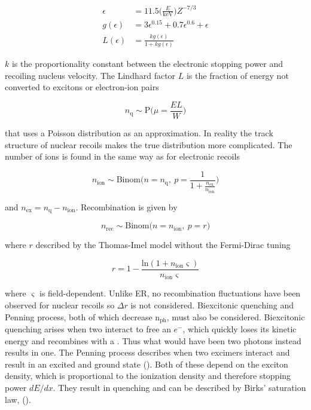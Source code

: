 \begin{subequations}
\begin{align}
\epsilon &= 11.5 \bigg( \frac{E}{\mathrm{keV}} \bigg) Z^{-7/3} \\
g( \epsilon ) &= 3 \epsilon ^{0.15} + 0.7 \epsilon ^{0.6} + \epsilon \\
L( \epsilon ) &= \frac{k g( \epsilon ) }{1 + k g( \epsilon )}
\end{align}
\label{eq:er_nr_calibrations_parameter_determ_nr_lindhard}
\end{subequations}

$k$ is the proportionality constant between the electronic stopping power and recoiling nucleus velocity.  The Lindhard factor
$L$ is the fraction of energy not converted to excitons or electron-ion pairs

\begin{equation}
n_{\mathrm{q}} \sim \mathrm{P} \bigg( \mu = \frac{E L}{W} \bigg)
\label{eq:er_nr_calibrations_parameter_determ_nr_quanta}
\end{equation}

\noindent that uses a Poisson distribution as an approximation.  In reality the track structure of nuclear recoils makes the true
distribution more complicated.  The number of ions is found in the same way as for
electronic recoils

\begin{equation}
n_{\mathrm{ion}} \sim \mathrm{Binom} \Bigg(n = n_{\mathrm{q}},\ p = \frac{1}{1 + \frac{n_{\mathrm{ex}}}{n_{\mathrm{ion}}}} \Bigg)
\end{equation}

\noindent and $n_{\mathrm{ex}} = n_{\mathrm{q}} - n_{\mathrm{ion}}$.  Recombination is given by

\begin{equation}
n_{\mathrm{rec}} \sim \mathrm{Binom} \big(n = n_{\mathrm{ion}},\ p = r \big)
\end{equation}

\noindent where $r$ described by the Thomas-Imel model without the Fermi-Dirac tuning

\begin{equation}
r = 1 - \frac{\mathrm{ln} (1 + n_{\mathrm{ion}} \varsigma)}{n_{\mathrm{ion}} \varsigma}
\end{equation}

\noindent where $\varsigma$ is field-dependent.  Unlike ER, no recombination fluctuations have been observed for nuclear recoils so
$\Delta r$ is not considered.  Biexcitonic quenching and Penning process, both of which decrease
$\mathrm{n_{ph}}$, must also be considered.  Biexcitonic quenching arises when two
 interact to free an $e^-$, which quickly loses its kinetic energy
and recombines with a .  Thus what would have been two photons instead results in one.  The Penning process describes when
two excimers interact and result in an excited and ground state ().  Both of these depend on the exciton density, which
is proportional to the ionization density and therefore stopping power $dE / dx$.  They result in quenching and can be
described by Birks' saturation law,  ().

